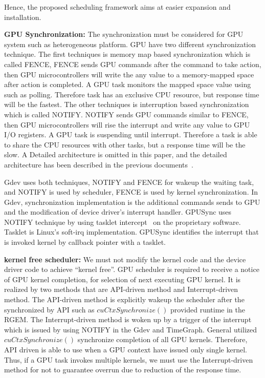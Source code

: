 Hence, the proposed scheduling framework aims at easier expansion and installation.

\textbf{GPU Synchronization:}
The synchronization must be considered for GPU system such as heterogeneous platform.
GPU have two different synchronization technique.
The first techniques is memory map based synchronization which is called FENCE,
FENCE sends GPU commands after the command to take action,
then GPU microcontrollers will write the any value to a memory-mapped space after action is completed.
A GPU task monitors the mapped space value using such as polling.
Therefore task has an exclusive CPU resource,
but response time will be the fastest.
The other techniques is interruption based synchronization which is called NOTIFY.
NOTIFY sends GPU commands similar to FENCE,
then GPU microcontrollers will rise the interrupt and write any value to GPU I/O registers.
A GPU task is suspending until interrupt.
Therefore a task is able to share the CPU resources with other tasks,
but a response time will be the slow.
A Detailed architecture is omitted in this paper,
and the detailed architecture has been described in the previous documents~\cite{kato:timegraph, kato:gdev, fujii:apsys2013}.

Gdev uses both techniques, NOTIFY and FENCE for wakeup the waiting task, 
and NOTIFY is used by scheduler, FENCE is used by kernel synchronization. 
In Gdev, synchronization implementation is the additional commands sends to GPU and the modification of device driver's interrupt handler.
GPUSync uses NOTIFY technique by using tasklet intercept~\cite{elliott2012robust} on the proprietary software.
Tasklet is Linux's soft-irq implementation.
GPUSync identifies the interrupt that is invoked kernel by callback pointer with a tasklet.

\textbf{kernel free scheduler:}
We must not modify the kernel code and the device driver code to achieve ``kernel free''.
GPU scheduler is required to receive a notice of GPU kernel completion, for selection of next executing GPU kernel.
It is realized by two methods that are API-driven method and Interrupt-driven method.
The API-driven method is explicitly wakeup the scheduler after the synchronized by API such as $cuCtxSynchronize()$ provided runtime in the RGEM.
The Interrupt-driven method is woken up by a trigger of the interrupt which is issued by using NOTIFY in the Gdev and TimeGraph.
General utilized $cuCtxSynchronize()$ synchronize completion of all GPU kernels.
Therefore, API driven is able to use when a GPU context have issued only single kernel.
Thus, if a GPU task invokes multiple kernels, we must use the Interrupt-driven method for not to guarantee overrun due to reduction of the response time.

